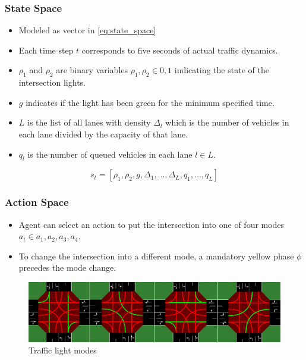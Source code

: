\documentclass[compress,12pt]{beamer}
\begin{document}
\begin{frame}[bg=arguelles.png]
      \frametitle{State Space}
      \begin{itemize}
      \item Modeled as vector in \ref{eq:state_space}
      \item Each time step \(t\) corresponds to five seconds of actual traffic dynamics.
      \item \(\rho_1\) and \(\rho_2\) are binary variables \(\rho_1, \rho_2 \in {0, 1}\) indicating the state of the intersection lights.
      \item \(g\) indicates if the light has been green for the minimum specified time.
      \item \(L\) is the list of all lanes with density \(\Delta_l\) which is the number of vehicles in each lane divided by the capacity of that lane.
      \item \(q_l\) is the number of queued vehicles in each lane \(l \in L\).
      \end{itemize}

    \begin{equation}
    s_t = [\rho_1, \rho_2, g, \Delta_1, \ldots, \Delta_L, q_1, \ldots, q_L]
    \label{eq:state_space}
    \end{equation}
\end{frame}

\begin{frame}[bg=arguelles.png]
      \frametitle{Action Space}
      \begin{itemize}
      \item Agent can select an action to put the intersection into one of four modes \(a_t \in {a_1, a_2, a_3, a_4}\).
      \item To change the intersection into a different mode, a mandatory yellow phase $\phi$ precedes the mode change.
      \end{itemize}

    \begin{figure}[htbp]
      \centering
      \includegraphics[width=0.8\linewidth]{actions.png}
      \caption{Traffic light modes}
      \label{fig:action_space}
    \end{figure}
\end{frame}
\end{document}
